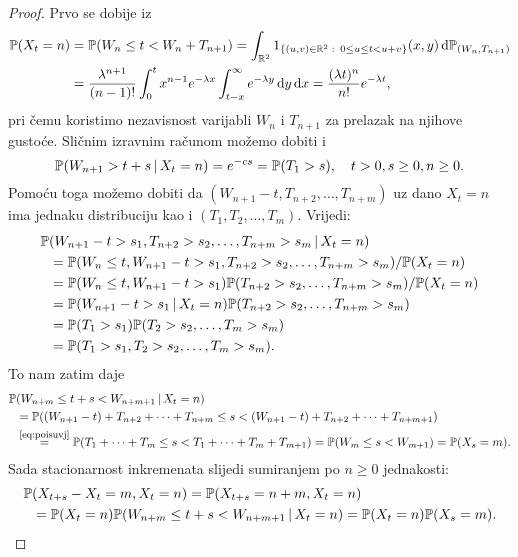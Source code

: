 \documentclass[main.tex]{subfiles}
\begin{document}
\begin{proof}
	Prvo se dobije iz
	\begin{align}
		\mathbb{P}(X_t = n) & = \mathbb{P}(W_n \le t < W_n + T_{n+1}) =
		\int_{\mathbb{R}^2} 1_{\left\{ (u, v) \in \mathbb{R}^2 \, \colon \, 0 \le u \le t < u+v \right\}}(x,y) \,\mathrm d \mathbb{P}_{(W_n, T_{n+1})} \\ &= \frac{\lambda^{n+1}}{(n-1)!} \int_0^t x^{n-1}e^{-\lambda x} \int_{t-x}^\infty e^{-\lambda y} \,\mathrm d y \,\mathrm d x
		= \frac{(\lambda t)^n}{n!}e^{-\lambda t},
	\end{align}
	pri čemu koristimo nezavisnost varijabli \( W_n \) i \( T_{n+1} \) za prelazak na njihove gustoće. Sličnim izravnim računom možemo dobiti i
	\begin{equation} \label{eq:poiswnuzxt}
		\mathbb{P}(W_{n+1} > t + s \, \vert \, X_t = n) = e^{-cs} = \mathbb{P}(T_1 > s), \quad t > 0, s \ge 0, n \ge 0.
	\end{equation}
	Pomoću toga možemo dobiti da \( (W_{n+1} - t, T_{n+2}, \ldots, T_{n+m}) \) uz dano \( X_t = n \)
	ima jednaku distribuciju kao i \( (T_1, T_2, \ldots, T_m) \). Vrijedi:
	\begin{align}
		\mathbb{P} & (W_{n+1} -t > s_1 , T_{n+2} > s_2, \ldots, T_{n+m} > s_m \, \vert \, X_t = n)         \\
		   & =\mathbb{P}(W_n \le t, W_{n+1} -t > s_1, T_{n+2} > s_2, \ldots, T_{n+m} > s_m)/\mathbb{P}(X_t=n) \\
		   & =\mathbb{P}(W_n \le t, W_{n+1} -t > s_1)\mathbb{P}(T_{n+2}>s_2,\ldots,T_{n+m}>s_m)/\mathbb{P}(X_t=n)     \\
		   & =\mathbb{P}(W_{n+1} -t>s_1 \, \vert \, X_t = n)\mathbb{P}(T_{n+2}>s_2,\ldots,T_{n+m}>s_m)             \\
		   & =\mathbb{P}(T_1>s_1)\mathbb{P}(T_2>s_2,\ldots,T_m>s_m)                                           \\
		   & =\mathbb{P}(T_1>s_1,T_2>s_2,\ldots,T_m>s_m). \label{eq:poisuvj}
	\end{align}
	To nam zatim daje
	\begin{equation}
		\begin{aligned} \label{eq:poislema}
			\mathbb{P} & (W_{n+m} \le t+s < W_{n+m+1} \, \vert \, X_t = n)                                                   \\
			   & =\mathbb{P}((W_{n+1}-t)+T_{n+2} + \cdots + T_{n+m} \le s < (W_{n+1}-t) + T_{n+2} + \cdots + T_{n+m+1}) \\
			   & \overset{\footnotesize\eqref{eq:poisuvj}}= \mathbb{P}(T_1+\cdots+T_m \le s < T_1+\cdots+T_m+T_{m+1})
			= \mathbb{P}(W_m \le s < W_{m+1}) = \mathbb{P}(X_s=m).
		\end{aligned}
	\end{equation}
	Sada stacionarnost inkremenata slijedi sumiranjem po \( n \ge 0 \) jednakosti:
	\begin{equation}
		\begin{aligned}
			\mathbb{P} & (X_{t+s}-X_t =  m, X_t=n) = \mathbb{P}(X_{t+s}=n+m, X_t=n)                              \\
			   & = \mathbb{P}(X_t=n)\mathbb{P}(W_{n+m} \le t+s < W_{n+m+1} \, \vert \, X_t = n) = \mathbb{P}(X_t=n)\mathbb{P}(X_s=m).
		\end{aligned}
	\end{equation}


\end{proof}
\end{document}
